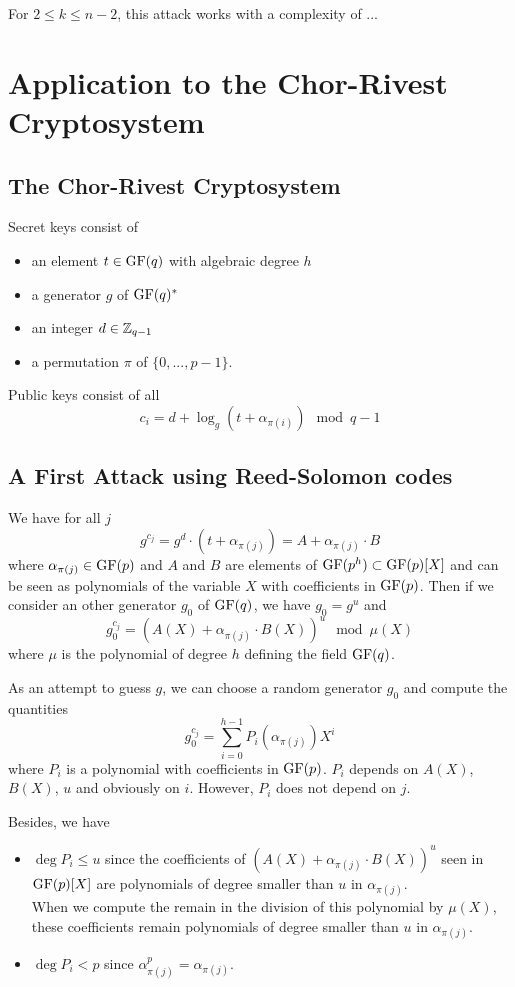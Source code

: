 \documentclass[12pt,a4paper,titlepage]{article}
\begin{document}
For $2 \leq k \leq n-2$, this attack works with a complexity of ...


\section{Application to the Chor-Rivest Cryptosystem}

\subsection{The Chor-Rivest Cryptosystem}

Secret keys consist of
\begin{itemize}
\item an element $t \in \text{GF}(q)$ with algebraic degree $h$
\item a generator $g$ of $\text{GF} (q)^{\ast} $
\item an integer $d \in \mathbb{Z}_{q-1} $
\item a permutation $\pi$ of $\{ 0, ... , p-1 \}$.
\end{itemize}

Public keys consist of all
$$ c_i = d + \log_g(t + \alpha_{\pi(i)}) \mod q-1 $$

\subsection{A First Attack using Reed-Solomon codes}

We have for all $j$
$$ g^{c_j} = g^d \cdot (t + \alpha_{\pi(j)} ) = A + \alpha_{\pi(j)} \cdot B $$
where $\alpha_{\pi(j)} \in \text{GF}(p)$ and $A$ and $B$ are elements of $\text{GF}(p^h) \subset \text{GF}(p)[X]$ and can be seen as polynomials of the variable $X$ with coefficients in $\text{GF}(p)$.
Then if we consider an other generator $g_0$ of $\GF(q)^{\*}$, we have $g_0 = g^u$ and
$$ g_0 ^{c_j} = \left( A(X) + \alpha_{\pi(j)} \cdot B(X) \right)^u \mod \mu(X) $$
where $\mu$ is the polynomial of degree $h$ defining the field $\text{GF}(q)$.

As an attempt to guess $g$, we can choose a random generator $g_0$ and compute the quantities
$$ g_0 ^{c_j} = \sum_{i=0}^{h-1} P_i(\alpha_{\pi(j)}) X^i $$
where $P_i$ is a polynomial with coefficients in $\text{GF}(p)$. $P_i$ depends on $A(X)$, $B(X)$, $u$ and obviously on $i$. However, $P_i$ does not depend on $j$.

Besides, we have
\begin{itemize}
\item $\deg P_i \leq u$ since the coefficients of $\left( A(X) + \alpha_{\pi(j)} \cdot B(X) \right)^u$ seen in $\text{GF}(p)[X]$ are polynomials of degree smaller than $u$ in $\alpha_{\pi(j)}$.\\
When we compute the remain in the division of this polynomial by $\mu(X)$, these coefficients remain polynomials of degree smaller than $u$ in $\alpha_{\pi(j)}$.
\item $\deg P_i < p$ since $\alpha_{\pi(j)}^p = \alpha_{\pi(j)}$.
\end{itemize}
\end{document}
